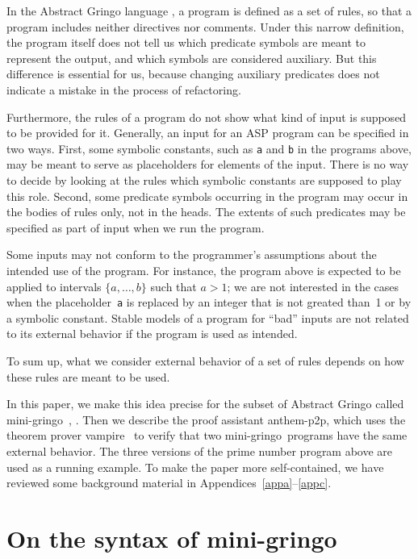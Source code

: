 \documentclass{article}
\def\gringo{{\sc gringo}}
\def\vampire{{\sc vampire}}
\begin{document}
In the Abstract Gringo language \cite{geb15}, a program is defined as
a set of rules, so that a program
includes neither directives nor comments.  Under this narrow definition,
the program itself does not tell us which predicate symbols are meant to
represent the output, and which symbols are considered
auxiliary.  But this difference is essential for us, because changing
auxiliary predicates does not indicate a mistake in the process of
refactoring.

Furthermore, the rules of a program do not show what kind of input is
supposed to be provided for it.
Generally, an input for an ASP program can be specified in two ways.
First, some symbolic constants, such as {\tt a} and {\tt b} in the
programs above, may be meant to serve as placeholders for elements of
the input.
There is no way to decide by looking at the rules
which symbolic constants are supposed to play this role.
Second, some predicate symbols occurring in the program may occur in
the bodies of rules only, not in the heads.  The extents of such
predicates may be specified as part of input when we run the program.

Some inputs may not conform to the programmer's assumptions about
the intended use of the program.  For instance, the program above is
expected to be applied to intervals $\{a,\dots,b\}$ such that $a>1$;
we are not interested in the cases when the placeholder~{\tt a} is
replaced by an integer that is not greated than~1 or by a symbolic constant.
Stable models of a program for ``bad'' inputs are not related to its
external behavior if the program is used as intended.

To sum up, what we consider external behavior of a set of rules
depends on how these rules are meant to be used.

In this paper, we make this idea precise
for the subset of
Abstract Gringo called mini-\gringo\ \cite[Section~2]{fan20},
\cite[Section~2.1]{fan22}.   Then we describe the proof assistant
{\sc anthem-p2p}, which uses
the theorem prover \vampire\ \cite{vor13}
 to verify that two mini-\gringo\ programs have the
 same external behavior.  The three versions of the prime number program
 above are used as a running example.  To make the paper more
 self-contained, we have reviewed some background material in
 Appendices~\ref{appa}--\ref{appc}.

\section{On the syntax of mini-\gringo}\label{sec:mg}
\end{document}

